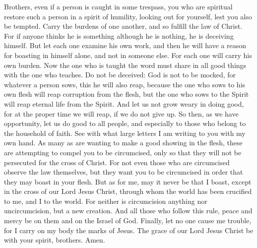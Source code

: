 \begin{biblechapter} %
 Brothers, even if a person is caught in some trespass, you who are spiritual restore such a person in a spirit of humility, looking out for yourself, lest you also be tempted.
\verse Carry the burdens of one another, and so fulfill the law of Christ.
\verse For if anyone thinks he is something although he is nothing, he is deceiving himself.
\verse But let each one examine his own work, and then he will have a reason for boasting in himself alone, and not in someone else.
\verse For each one will carry his own burden.
 Now the one who is taught the word must share in all good things with the one who teaches.
\verse Do not be deceived: God is not to be mocked, for whatever a person sows, this he will also reap,
\verse because the one who sows to his own flesh will reap corruption from the flesh, but the one who sows to the Spirit will reap eternal life from the Spirit.
\verse And let us not grow weary in doing good, for at the proper time we will reap, if we do not give up.
\verse So then, as we have opportunity, let us do good to all people, and especially to those who belong to the household of faith.
 See with what large letters I am writing to you with my own hand.
\verse As many as are wanting to make a good showing in the flesh, these are attempting to compel you to be circumcised, only so that they will not be persecuted for the cross of Christ.
\verse For not even those who are circumcised observe the law themselves, but they want you to be circumcised in order that they may boast in your flesh.
\verse But as for me, may it never be that I boast, except in the cross of our Lord Jesus Christ, through whom the world has been crucified to me, and I to the world.
\verse For neither is circumcision anything nor uncircumcision, but a new creation.
\verse And all those who follow this rule, peace and mercy be on them and on the Israel of God.
 Finally, let no one cause me trouble, for I carry on my body the marks of Jesus.
\verse The grace of our Lord Jesus Christ be with your spirit, brothers. Amen.
\end{biblechapter}

